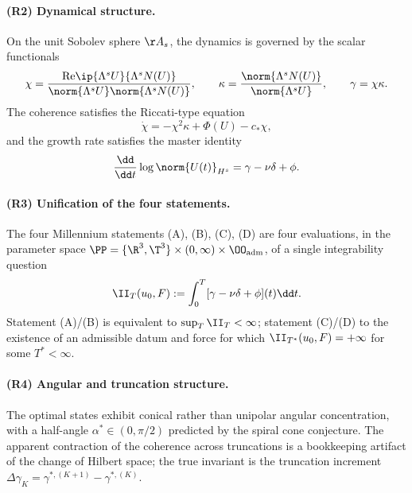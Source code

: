 \paragraph{(R2) Dynamical structure.}
On the unit Sobolev sphere $\AA_s$, the dynamics is governed by the 
scalar functionals
\begin{equation}\label{eq:chi-kappa-gamma}
\chi = \frac{\mathrm{Re}\ip{\Lambda^s U}{\Lambda^s N(U)}}
            {\norm{\Lambda^s U}\norm{\Lambda^s N(U)}},
\qquad
\kappa = \frac{\norm{\Lambda^s N(U)}}{\norm{\Lambda^s U}},
\qquad
\gamma = \chi\kappa.
\end{equation}
The coherence satisfies the Riccati-type equation
\begin{equation}\label{eq:riccati-concl}
\dot\chi = -\chi^2\kappa + \Phi(U) - c_\ast\chi,
\end{equation}
and the growth rate satisfies the master identity
\begin{equation}\label{eq:master-concl}
\frac{\dd}{\dd t}\log\norm{U(t)}_{H^s} = \gamma - \nu\delta + \phi.
\end{equation}

\paragraph{(R3) Unification of the four statements.}
The four Millennium statements (A), (B), (C), (D) are four 
evaluations, in the parameter space 
$\PP = \{\R^3,\T^3\}\times(0,\infty)\times\OO_{\mathrm{adm}}$, of a 
single integrability question
\begin{equation}\label{eq:unification-concl}
\II_T(u_0,F) := \int_0^T[\gamma - \nu\delta + \phi](t)\dd t.
\end{equation}
Statement (A)/(B) is equivalent to $\sup_T\II_T<\infty$; statement 
(C)/(D) to the existence of an admissible datum and force for which 
$\II_{T^\ast}(u_0,F)=+\infty$ for some $T^\ast<\infty$.

\paragraph{(R4) Angular and truncation structure.}
The optimal states exhibit conical rather than unipolar angular 
concentration, with a half-angle $\alpha^\ast\in(0,\pi/2)$ predicted 
by the spiral cone conjecture. The apparent contraction of the 
coherence across truncations is a bookkeeping artifact of the change 
of Hilbert space; the true invariant is the truncation increment 
$\Delta\gamma_K = \gamma^{\ast,(K+1)} - \gamma^{\ast,(K)}$.

